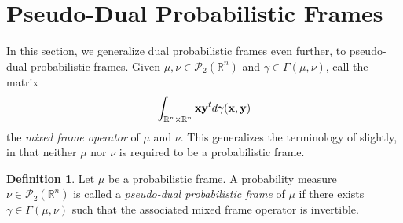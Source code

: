 \documentclass{amsart}
\numberwithin{equation}{section}
\theoremstyle{plain}
\theoremstyle{remark}
\theoremstyle{definition}
\newtheorem{definition}[theorem]{Definition}
\begin{document}
\section{Pseudo-Dual Probabilistic Frames}\label{pseudoDual}

In this section, we generalize dual probabilistic frames even further, to pseudo-dual probabilistic frames. Given $\mu, \nu \in \mathcal{P}_2(\mathbb{R}^n)$ and $\gamma \in \Gamma(\mu, \nu)$, call the matrix  
$$\int_{\mathbb{R}^n \times \mathbb{R}^n} {\bf x}{\bf y}^t d\gamma({\bf x, y})$$
the \emph{mixed frame operator} of $\mu$ and $\nu$. This generalizes the terminology of  slightly, in that neither $\mu$ nor $\nu$ is required to be a probabilistic frame.

\begin{definition}
     Let $\mu$ be a probabilistic frame. A probability measure $\nu \in \mathcal{P}_2(\mathbb{R}^n)$ is called a \emph{pseudo-dual probabilistic frame} of $\mu$ if there exists $\gamma \in \Gamma(\mu, \nu)$ such that the associated mixed frame operator is invertible. 
\end{definition}
\end{document}
